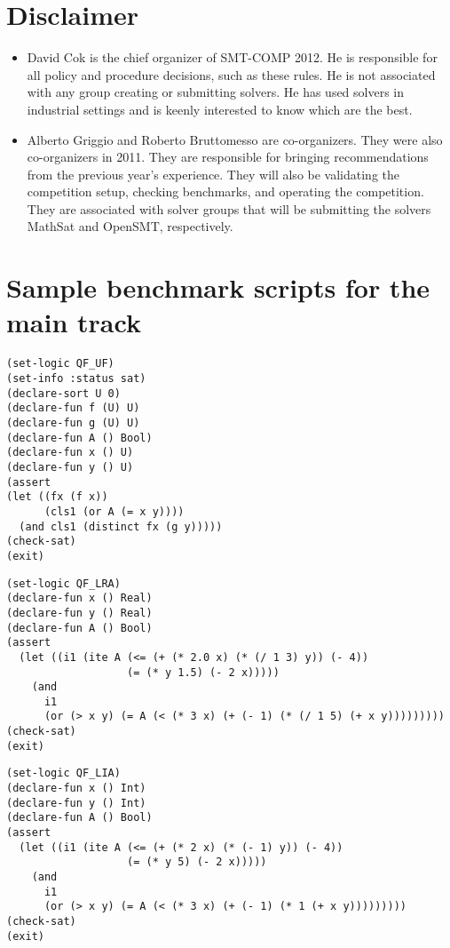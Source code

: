 \documentclass[12pt]{article}
\begin{document}
\section{Disclaimer}
\begin{itemize}
\item David Cok is the chief organizer of SMT-COMP 2012. He is 
responsible for all policy and procedure decisions, such as these
rules. He is not associated 
with any group creating or submitting solvers. He has used solvers
in industrial settings and is keenly interested to know which are the best.

\item Alberto Griggio and Roberto Bruttomesso are co-organizers. They 
were also co-organizers in 2011. They are responsible for bringing 
recommendations from the previous year's experience. They will also 
be validating the competition setup, checking benchmarks, and
operating the competition. They are associated with solver groups
that will be submitting the solvers 
MathSat and OpenSMT, respectively.
\end{itemize}



\appendix
\section{Sample benchmark scripts for the main track}


{\footnotesize
\begin{verbatim}
(set-logic QF_UF)
(set-info :status sat)
(declare-sort U 0)
(declare-fun f (U) U)
(declare-fun g (U) U)
(declare-fun A () Bool)
(declare-fun x () U)
(declare-fun y () U)
(assert
(let ((fx (f x))
      (cls1 (or A (= x y))))
  (and cls1 (distinct fx (g y)))))
(check-sat)
(exit)
\end{verbatim}}



{\footnotesize
\begin{verbatim}
(set-logic QF_LRA)
(declare-fun x () Real)
(declare-fun y () Real)
(declare-fun A () Bool)
(assert
  (let ((i1 (ite A (<= (+ (* 2.0 x) (* (/ 1 3) y)) (- 4))
                   (= (* y 1.5) (- 2 x)))))
    (and
      i1
      (or (> x y) (= A (< (* 3 x) (+ (- 1) (* (/ 1 5) (+ x y)))))))))
(check-sat)
(exit)
\end{verbatim}}



{\footnotesize
\begin{verbatim}
(set-logic QF_LIA)
(declare-fun x () Int)
(declare-fun y () Int)
(declare-fun A () Bool)
(assert
  (let ((i1 (ite A (<= (+ (* 2 x) (* (- 1) y)) (- 4))
                   (= (* y 5) (- 2 x)))))
    (and
      i1
      (or (> x y) (= A (< (* 3 x) (+ (- 1) (* 1 (+ x y)))))))))
(check-sat)
(exit)
\end{verbatim}}
\end{document}
